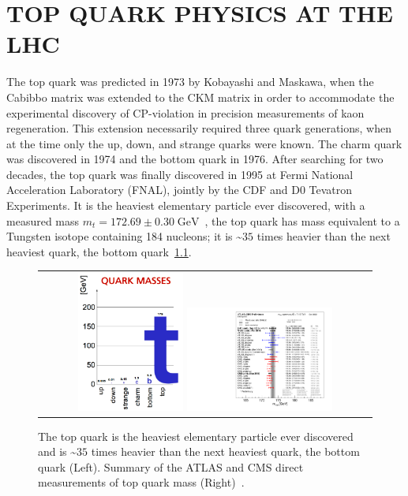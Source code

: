 
\chapter{TOP QUARK PHYSICS AT THE LHC}
\label{Top_Quark_Physics_at_the_LHC}
The top quark was predicted in 1973 by Kobayashi and Maskawa, when the Cabibbo matrix was extended to the CKM matrix in order to accommodate the experimental discovery of CP-violation in precision measurements of kaon regeneration.
This extension necessarily required three quark generations, when at the time only the up, down, and strange quarks were known.
The charm quark was discovered in 1974 and the bottom quark in 1976.
After searching for two decades, the top quark was finally discovered in 1995 at Fermi National Acceleration Laboratory (FNAL), jointly by the CDF and D0 Tevatron Experiments.
It is the heaviest elementary particle ever discovered, with a measured mass $m_t = 172.69 \pm 0.30 \; \si{\GeV}$~\cite{bib:PDG}, the top quark has mass equivalent to a Tungsten isotope containing 184 nucleons; it is \sim$35$ times heavier than the next heaviest quark, the bottom quark~\ref{QuarkMasses}.
\begin{figure}[!htb]
  \begin{center}
    \begin{tabular}{c}
        \includegraphics[width=0.325\textwidth]{fig_TopQuark/TopQuarkMass.png}
        \includegraphics[width=0.45\textwidth]{fig_TopQuark/LHC_topmass_oct22.pdf}
    \end{tabular}
    \caption{The top quark is the heaviest elementary particle ever discovered and is \sim$35$ times heavier than the next heaviest quark, the bottom quark (Left).
            Summary of the ATLAS and CMS direct measurements of top quark mass (Right)~\cite{LHCTopWGSummaryPlots}.
            }
    \label{QuarkMasses}
  \end{center}
\end{figure}
